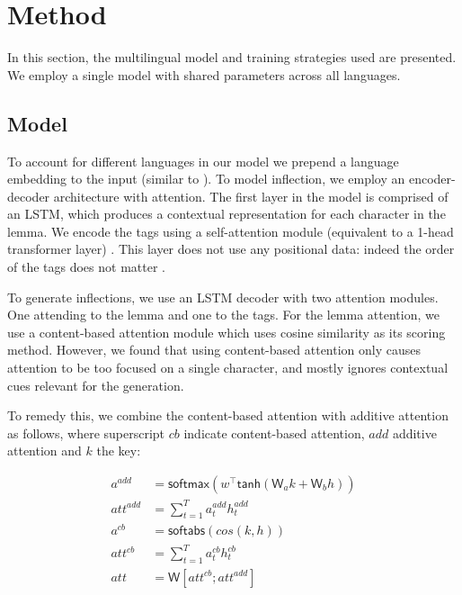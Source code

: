 \documentclass[11pt,a4paper]{article}
\newcommand\jp[1]{\textbf{JP: #1}}
\begin{document}


\section{Method}

In this section, the multilingual model and training strategies used
are presented. We employ a single model with shared parameters
across all languages. 

\subsection{Model}
To account for different languages in our model we prepend a language
embedding to the input (similar to \cite{johnson2017google,
raffel2019exploring}).  To model inflection, we employ an
encoder-decoder architecture with attention. The first layer in the
model is comprised of an LSTM, which produces a contextual
representation for each character in the lemma.  We encode the tags
using a self-attention module (equivalent to a 1-head transformer
layer) \cite{DBLP:conf/nips/VaswaniSPUJGKP17}.  This layer does not
use any positional data: indeed the order of the tags does not matter
\cite{DBLP:conf/emnlp/AnastasopoulosN19}.

To generate inflections, we use an LSTM decoder with two attention
modules. One attending to the lemma and one to the tags. For the lemma
attention, we use a content-based attention module
\cite{graves2014neural, karunaratne2021robust} which uses cosine
similarity as its scoring method.  However, we found that using
content-based attention only causes attention to be too focused on a
single character, and mostly ignores contextual cues relevant for the
generation.

To remedy this, we combine the content-based attention with additive
attention as follows, where superscript $cb$ indicate content-based attention,
$add$ additive attention and $k$ the key:

\begin{align*}
	a^{add} & = \mathsf{softmax}(w^\top\mathsf{tanh}(\mathsf{W}_ak + \mathsf{W}_bh))\\
	att^{add} & = \sum_{t=1}^{T}a_t^{add}h_t^{add}\\
	a^{cb} & = \mathsf{softabs}(cos(k,h))\\
	att^{cb} & = \sum_{t=1}^{T}a_t^{cb}h_t^{cb}\\
	att & = \mathsf{W}[att^{cb}; att^{add}]
\end{align*}
\end{document}
